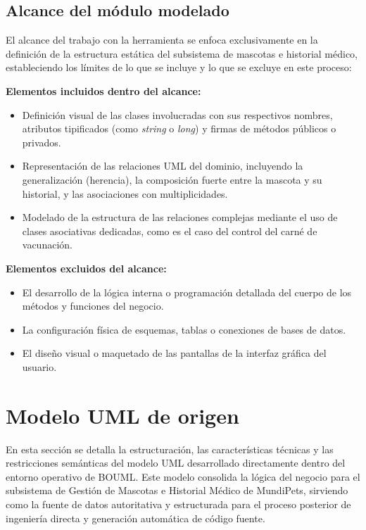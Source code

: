 \documentclass[journal,onecolumn]{IEEEtran}
\begin{document}
	\subsection{Alcance del módulo modelado}
	El alcance del trabajo con la herramienta se enfoca exclusivamente en la definición de la estructura estática del subsistema de mascotas e historial médico, estableciendo los límites de lo que se incluye y lo que se excluye en este proceso:
	
	\textbf{Elementos incluidos dentro del alcance:}
	\begin{itemize}[leftmargin=*]
		\item Definición visual de las clases involucradas con sus respectivos nombres, atributos tipificados (como \textit{string} o \textit{long}) y firmas de métodos públicos o privados.
		\item Representación de las relaciones UML del dominio, incluyendo la generalización (herencia), la composición fuerte entre la mascota y su historial, y las asociaciones con multiplicidades.
		\item Modelado de la estructura de las relaciones complejas mediante el uso de clases asociativas dedicadas, como es el caso del control del carné de vacunación.
	\end{itemize}
	
	\textbf{Elementos excluidos del alcance:}
	\begin{itemize}[leftmargin=*]
		\item El desarrollo de la lógica interna o programación detallada del cuerpo de los métodos y funciones del negocio.
		\item La configuración física de esquemas, tablas o conexiones de bases de datos.
		\item El diseño visual o maquetado de las pantallas de la interfaz gráfica del usuario.
	\end{itemize}
	
	\section{Modelo UML de origen}
	En esta sección se detalla la estructuración, las características técnicas y las restricciones semánticas del modelo UML desarrollado directamente dentro del entorno operativo de BOUML. Este modelo consolida la lógica del negocio para el subsistema de Gestión de Mascotas e Historial Médico de MundiPets, sirviendo como la fuente de datos autoritativa y estructurada para el proceso posterior de ingeniería directa y generación automática de código fuente.
	
\end{document}

